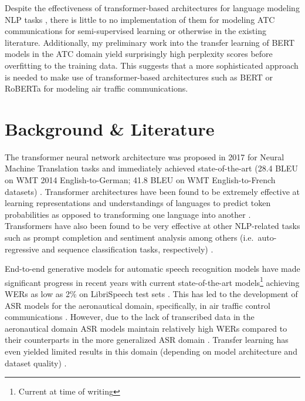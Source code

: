 \documentclass[10pt]{article}
\begin{document}
        Despite the effectiveness of transformer-based architectures for language modeling NLP tasks
        \cite{devlin_bert_2019,lewis_bart_2019,liu_roberta_2019}, there is little to no implementation
        of them for modeling ATC communications for semi-supervised learning or otherwise in the
        existing literature.
        Additionally, my preliminary work into the transfer learning of BERT models in the ATC
        domain yield surprisingly high perplexity scores before overfitting to the training data.
        This suggests that a more sophisticated approach is needed to make use of transformer-based
        architectures such as BERT or RoBERTa for modeling air traffic communications.

    \section{Background \& Literature}
        The transformer neural network architecture was proposed in 2017 for Neural Machine Translation tasks and immediately achieved
        state-of-the-art (28.4 BLEU on WMT 2014 English-to-German; 41.8 BLEU on WMT English-to-French datasets)
        \cite{vaswani_attention_2017}. Transformer architectures have been found to be extremely effective at learning representations
        and understandings of languages to predict token probabilities as opposed to transforming one language into another
        \cite{devlin_bert_2019,liu_roberta_2019}. Transformers have also been found to be very effective at
        other NLP-related tasks such as prompt completion and sentiment analysis among others (i.e.~auto-regressive and sequence
        classification tasks, respectively) \cite{lewis_bart_2019,radford_improving_2018}.


        End-to-end generative models for automatic speech recognition models have made significant progress in recent years with
        current state-of-the-art models\footnote{Current at time of writing} achieving WERs as low as 2\% on LibriSpeech test sets
        \cite{han_contextnet_2020,kriman_quartznet_2020,baevski_wav2vec_2020,li_jasper_2019}. This has led to the development of ASR
        models for the aeronautical domain, specifically, in air traffic control communications
        \cite{badrinath_automatic_2022,smidl_air_2019,zuluaga-gomez_automatic_2020,srinivasamurthy_semi-supervised_2017}.
        However, due to the lack of transcribed data in the aeronautical domain
        \cite{zuluaga-gomez_automatic_2020,srinivasamurthy_semi-supervised_2017,badrinath_automatic_2022,smidl_air_2019}
        ASR models maintain relatively high WERs compared to their counterparts in the more generalized ASR domain
        \cite{zuluaga-gomez_automatic_2020,badrinath_automatic_2022}. Transfer learning has even yielded limited results
        in this domain (depending on model architecture and dataset quality)
        \cite{badrinath_automatic_2022,zuluaga-gomez_automatic_2020}.
\end{document}
